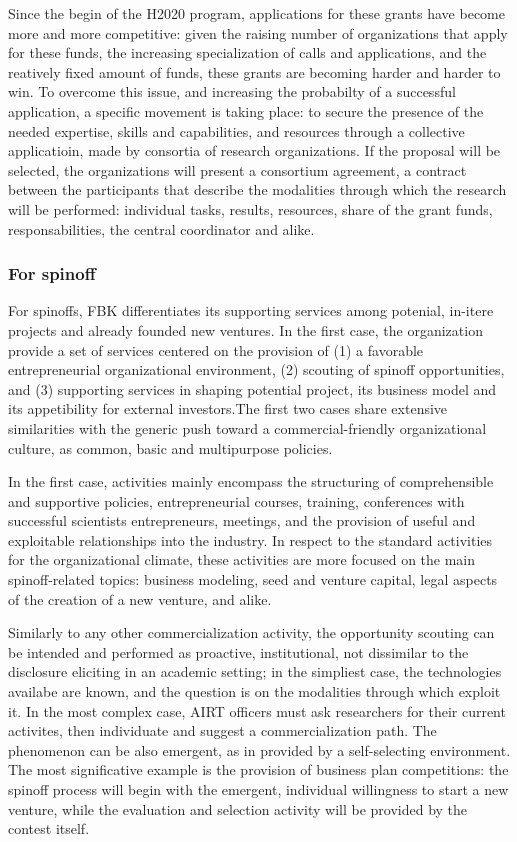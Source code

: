 Since the begin of the H2020 program, applications for these grants have become more and more competitive: given the raising number of organizations that apply for these funds, the increasing specialization of calls and applications, and the reatively fixed amount of funds, these grants are becoming harder and harder to win. To overcome this issue, and increasing the probabilty of a successful application, a specific movement is taking place: to secure the presence of the needed expertise, skills and capabilities, and resources through a collective applicatioin, made by consortia of research organizations. If the proposal will be selected, the organizations will present a consortium agreement, a contract between the participants that describe the modalities through which the research will be performed: individual tasks, results, resources, share of the grant funds, responsabilities, the central coordinator and alike. 

\subsubsection{For spinoff}

For spinoffs, FBK differentiates its supporting services among potenial, in-itere projects and already founded new ventures. In the first case, the organization provide a set of services centered on the provision of (1) a favorable entrepreneurial organizational environment, (2) scouting of spinoff opportunities, and (3) supporting services in shaping potential project, its business model and its appetibility for external investors.The first two cases share extensive similarities with the generic push toward a commercial-friendly organizational culture, as common, basic and multipurpose policies.

In the first case, activities mainly encompass the structuring of comprehensible and supportive policies,  entrepreneurial courses, training, conferences with successful scientists entrepreneurs, meetings, and the provision of useful and exploitable relationships into the industry. In respect to the standard activities for the organizational climate, these activities are more focused on the main spinoff-related topics: business modeling, seed and venture capital, legal aspects of the creation of a new venture, and alike. 

Similarly to any other commercialization activity, the opportunity scouting can be intended and performed as proactive, institutional, not dissimilar to the disclosure eliciting in an academic setting; in the simpliest case, the technologies availabe are known, and the question is on the modalities through which exploit it. In the most complex case, AIRT officers must ask researchers for their current activites, then individuate and suggest a commercialization path. The phenomenon can be also emergent, as in provided by a self-selecting environment. The most significative example is the provision of business plan competitions: the spinoff process will begin with the emergent, individual willingness to start a new venture, while the evaluation and selection activity will be provided by the contest itself.

